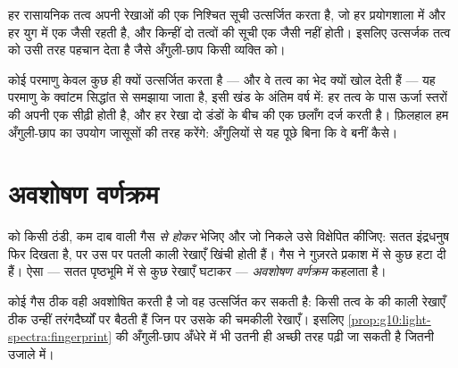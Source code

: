 \begin{proposition}[तत्वों की अँगुली-छाप]\label{prop:g10:light-spectra:fingerprint}
हर रासायनिक तत्व अपनी  रेखाओं की एक निश्चित सूची
उत्सर्जित करता है, जो हर प्रयोगशाला में और हर युग में एक जैसी रहती है,
और किन्हीं दो तत्वों की सूची एक जैसी नहीं होती। इसलिए  उत्सर्जक तत्व को उसी तरह पहचान देता है जैसे अँगुली-छाप किसी
व्यक्ति को।
\end{proposition}
\admitted

\begin{remark}[रेखाएँ ही क्यों?]\label{rem:g10:light-spectra:whylines}
कोई परमाणु केवल कुछ ही  क्यों उत्सर्जित करता है ---
और वे  तत्व का भेद क्यों खोल देती हैं --- यह परमाणु
के क्वांटम सिद्धांत से समझाया जाता है, इसी खंड के अंतिम वर्ष में: हर
तत्व के पास ऊर्जा स्तरों की अपनी एक सीढ़ी होती है, और हर रेखा दो डंडों
के बीच की एक छलाँग दर्ज करती है। फ़िलहाल हम अँगुली-छाप का उपयोग जासूसों
की तरह करेंगे: अँगुलियों से यह पूछे बिना कि वे बनीं कैसे।
\end{remark}

\section{अवशोषण वर्णक्रम}

\begin{definition}[अवशोषण वर्णक्रम]\label{def:g10:light-spectra:absorption}
 को किसी ठंडी, कम दाब वाली गैस \emph{से होकर}
भेजिए और जो निकले उसे विक्षेपित कीजिए: सतत इंद्रधनुष फिर दिखता है, पर
उस पर पतली काली रेखाएँ खिंची होती हैं। गैस ने गुज़रते प्रकाश में से कुछ
 हटा दी हैं। ऐसा  --- सतत पृष्ठभूमि
में से कुछ रेखाएँ घटाकर --- \emph{अवशोषण वर्णक्रम} कहलाता है।
\end{definition}

\begin{proposition}\label{prop:g10:light-spectra:kirchhoff}
कोई गैस ठीक वही  अवशोषित करती है जो वह उत्सर्जित कर
सकती है: किसी तत्व के  की काली रेखाएँ ठीक उन्हीं
तरंगदैर्घ्यों पर बैठती हैं जिन पर उसके 
की चमकीली रेखाएँ। इसलिए \cref{prop:g10:light-spectra:fingerprint} की अँगुली-छाप अँधेरे में भी उतनी ही अच्छी
तरह पढ़ी जा सकती है जितनी उजाले में।
\end{proposition}
\admitted

